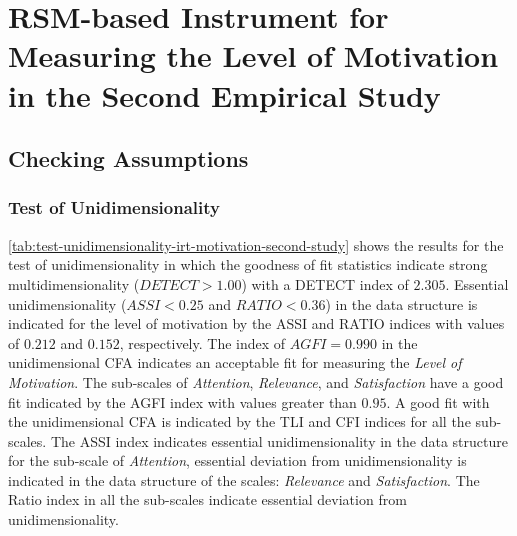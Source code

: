 \newpage
\section{RSM-based Instrument for Measuring the Level of Motivation in the Second Empirical Study}
\label{sec:irt-motivation-second-study}

\subsection{Checking Assumptions}

\subsubsection*{Test of Unidimensionality}

\autoref{tab:test-unidimensionality-irt-motivation-second-study} shows the results for the test of unidimensionality in which the goodness of fit statistics indicate strong multidimensionality ($DETECT > 1.00$) with a DETECT index of $2.305$.
Essential unidimensionality ($ASSI < 0.25$ and $RATIO < 0.36$) in the data structure is indicated for the level of motivation by the ASSI and RATIO indices with values of $0.212$ and $0.152$, respectively.
The index of $AGFI = 0.990$ in the unidimensional CFA indicates an acceptable fit for measuring the \emph{Level of Motivation}.
The sub-scales of \emph{Attention}, \emph{Relevance}, and \emph{Satisfaction} have a good fit indicated by the AGFI index with values greater than $0.95$.
A good fit with the unidimensional CFA is indicated by the TLI and CFI indices for all the sub-scales.
The ASSI index indicates essential unidimensionality in the data structure for the sub-scale of \emph{Attention}, essential deviation from unidimensionality is indicated in the data structure of the scales: \emph{Relevance} and \emph{Satisfaction}.
The Ratio index in all the sub-scales indicate essential deviation from unidimensionality.

